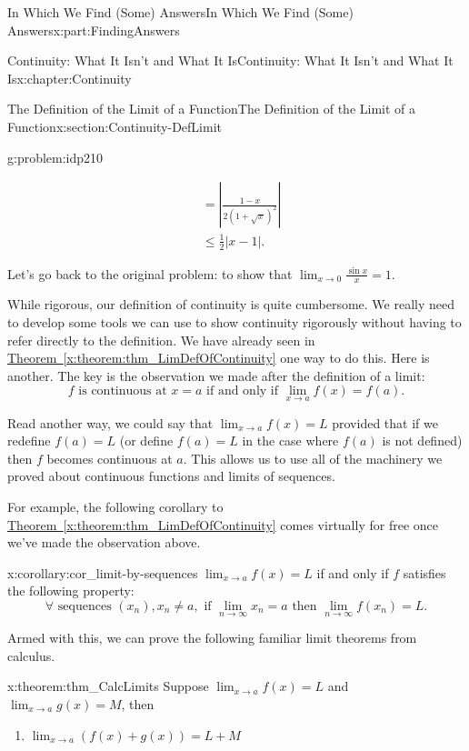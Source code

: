 \documentclass[oneside,10pt,]{book}
\newcommand{\xreffont}{\relax}
\numberwithin{equation}{section}
\newcommand{\abs}[1]{\left|#1\right|}
\def\limit#1#2#3{{\displaystyle\lim_{#1\rightarrow #2}#3}}
\newcommand{\amp}{&}
\begin{document}
\begin{partptx}{In Which We Find (Some) Answers}{}{In Which We Find (Some) Answers}{}{}{x:part:FindingAnswers}
\begin{chapterptx}{Continuity: What It Isn't and What It Is}{}{Continuity: What It Isn't and What It Is}{}{}{x:chapter:Continuity}
\begin{sectionptx}{The Definition of the Limit of a Function}{}{The Definition of the Limit of a Function}{}{}{x:section:Continuity-DefLimit}
\begin{problem}{}{g:problem:idp210}
\begin{enumerate}[font=\bfseries,label=(\alph*),ref=\alph*]
\begin{align*}
\amp =\abs{\frac{1-x}{2\left(1+\sqrt{x}\right)^2}}\\
\amp \leq\frac12\abs{x-1}.{}
\end{align*}
%
\end{enumerate}
\end{problem}
Let's go back to the original problem: to show that \(\limit{x}{0}{\textstyle\frac{\sin x}{x}}=1\).%
\par
While rigorous, our definition of continuity is quite cumbersome. We really need to develop some tools we can use to show continuity rigorously without having to refer directly to the definition. We have already seen in \hyperref[x:theorem:thm_LimDefOfContinuity]{Theorem~{\xreffont\ref{x:theorem:thm_LimDefOfContinuity}}} one way to do this. Here is another. The key is the observation we made after the definition of a limit:%
\begin{equation*}
f \text{ is continuous at } x=a \text{ if and only if } \limit{x}{a}{f(x)}=f(a)\text{.}
\end{equation*}
%
\par
Read another way, we could say that \(\limit{x}{a}{f(x)}=L\) provided that if we redefine \(f(a)=L\) (or define \(f(a)=L\) in the case where \(f(a)\) is not defined) then \(f\) becomes continuous at \(a\). This allows us to use all of the machinery we proved about continuous functions and limits of sequences.%
\par
For example, the following corollary to \hyperref[x:theorem:thm_LimDefOfContinuity]{Theorem~{\xreffont\ref{x:theorem:thm_LimDefOfContinuity}}} comes virtually for free once we've made the observation above.%
\begin{corollary}{}{}{x:corollary:cor_limit-by-sequences}%
\(\limit{x}{a}{f(x)}=L\) if and only if \(f\) satisfies the following property:%
\begin{equation*}
\forall \text{ sequences }  (x_n), x_n\ne a, \text{ if } \limit{n}{\infty}{x_n}=a \text{ then }   \limit{n}{\infty}{f(x_n)}=L. {}
\end{equation*}
%
\end{corollary}
Armed with this, we can prove the following familiar limit theorems from calculus.%
\begin{theorem}{}{}{x:theorem:thm_CalcLimits}%
 Suppose \(\limit{x}{a}{f(x)}=L\) and \(\limit{x}{a}{g(x)}=M\), then%
\begin{enumerate}[label=(\alph*)]
\item{}\(\displaystyle \limit{x}{a}{\left(f(x)+g(x)\right)}=L+M\)%

\end{enumerate}
\end{theorem}
\end{sectionptx}
\end{chapterptx}
\end{partptx}
\end{document}
